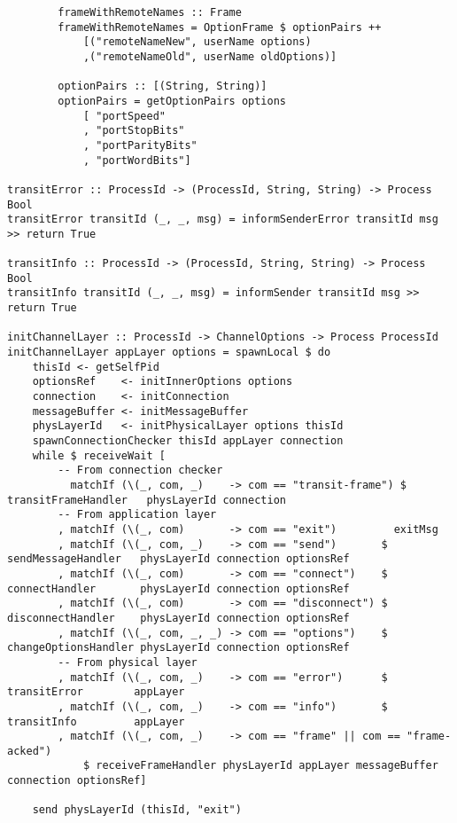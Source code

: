 \documentclass[russian,utf8,simple,emptystyle]{eskdtext}
\begin{document}
\begin{lstlisting}
        frameWithRemoteNames :: Frame
        frameWithRemoteNames = OptionFrame $ optionPairs ++
            [("remoteNameNew", userName options)
            ,("remoteNameOld", userName oldOptions)] 
            
        optionPairs :: [(String, String)]
        optionPairs = getOptionPairs options 
            [ "portSpeed"
            , "portStopBits"
            , "portParityBits"
            , "portWordBits"]

transitError :: ProcessId -> (ProcessId, String, String) -> Process Bool
transitError transitId (_, _, msg) = informSenderError transitId msg >> return True

transitInfo :: ProcessId -> (ProcessId, String, String) -> Process Bool
transitInfo transitId (_, _, msg) = informSender transitId msg >> return True 

initChannelLayer :: ProcessId -> ChannelOptions -> Process ProcessId
initChannelLayer appLayer options = spawnLocal $ do
    thisId <- getSelfPid
    optionsRef    <- initInnerOptions options
    connection    <- initConnection
    messageBuffer <- initMessageBuffer
    physLayerId   <- initPhysicalLayer options thisId
    spawnConnectionChecker thisId appLayer connection
    while $ receiveWait [
        -- From connection checker
          matchIf (\(_, com, _)    -> com == "transit-frame") $ transitFrameHandler   physLayerId connection
        -- From application layer
        , matchIf (\(_, com)       -> com == "exit")         exitMsg
        , matchIf (\(_, com, _)    -> com == "send")       $ sendMessageHandler   physLayerId connection optionsRef
        , matchIf (\(_, com)       -> com == "connect")    $ connectHandler       physLayerId connection optionsRef
        , matchIf (\(_, com)       -> com == "disconnect") $ disconnectHandler    physLayerId connection optionsRef
        , matchIf (\(_, com, _, _) -> com == "options")    $ changeOptionsHandler physLayerId connection optionsRef
        -- From physical layer
        , matchIf (\(_, com, _)    -> com == "error")      $ transitError        appLayer
        , matchIf (\(_, com, _)    -> com == "info")       $ transitInfo         appLayer
        , matchIf (\(_, com, _)    -> com == "frame" || com == "frame-acked")      
            $ receiveFrameHandler physLayerId appLayer messageBuffer connection optionsRef]

    send physLayerId (thisId, "exit")
\end{lstlisting}
\end{document}
